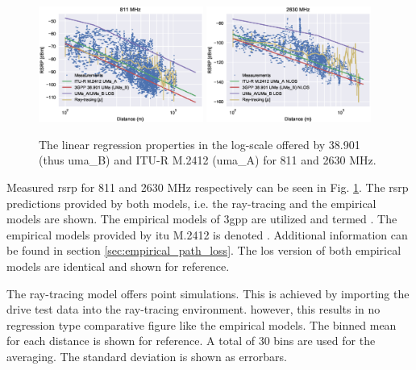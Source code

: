 \begin{figure}
    \centering
    \includegraphics[width=0.48\textwidth]{chapters/part_pathloss/figures/results/811MHz_RSRP.eps}
    \includegraphics[width=0.48\textwidth]{chapters/part_pathloss/figures/results/2630MHz_RSRP.eps}
    \caption{The linear regression properties in the log-scale offered by 38.901 (thus \gls{uma}\_B) and ITU-R M.2412 (\gls{uma}\_A) for 811 and 2630 MHz.}\label{fig:rsrp_811_2630_distance}
\end{figure}

Measured \gls{rsrp} for 811 and 2630 MHz respectively can be seen in Fig. \ref{fig:rsrp_811_2630_distance}. The \gls{rsrp} predictions provided by both models, i.e. the ray-tracing and the empirical models are shown. The empirical models of \gls{3gpp} are utilized and termed . The empirical models provided by \gls{itu} M.2412 is denoted . Additional information can be found in section \ref{sec:empirical_path_loss}. The \gls{los} version of both empirical models are identical and shown for reference. 

The ray-tracing model offers point simulations. This is achieved by importing the drive test data into the ray-tracing environment. however, this results in no regression type comparative figure like the empirical models. The binned mean for each distance is shown for reference. A total of 30 bins are used for the averaging. The standard deviation is shown as errorbars. 

